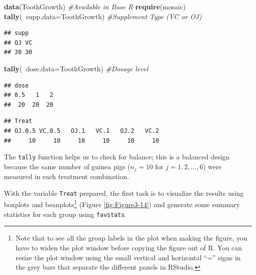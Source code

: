 \documentclass[]{book}
\newenvironment{Shaded}{\begin{snugshade}}{\end{snugshade}}
\newcommand{\KeywordTok}[1]{\textcolor[rgb]{0.13,0.29,0.53}{\textbf{#1}}}
\newcommand{\DataTypeTok}[1]{\textcolor[rgb]{0.13,0.29,0.53}{#1}}
\newcommand{\CommentTok}[1]{\textcolor[rgb]{0.56,0.35,0.01}{\textit{#1}}}
\newcommand{\OperatorTok}[1]{\textcolor[rgb]{0.81,0.36,0.00}{\textbf{#1}}}
\newcommand{\NormalTok}[1]{#1}
\let\rmarkdownfootnote\footnote%
\def\footnote{\protect\rmarkdownfootnote}
\theoremstyle{definition}
\theoremstyle{definition}
\theoremstyle{remark}
\begin{document}
\begin{Shaded}
\begin{Highlighting}[]
\KeywordTok{data}\NormalTok{(ToothGrowth) }\CommentTok{#Available in Base R}
\KeywordTok{require}\NormalTok{(mosaic)}
\KeywordTok{tally}\NormalTok{(}\OperatorTok{~}\NormalTok{supp,}\DataTypeTok{data=}\NormalTok{ToothGrowth) }\CommentTok{#Supplement Type (VC or OJ)}
\end{Highlighting}
\end{Shaded}

\begin{verbatim}
## supp
## OJ VC 
## 30 30
\end{verbatim}

\begin{Shaded}
\begin{Highlighting}[]
\KeywordTok{tally}\NormalTok{(}\OperatorTok{~}\NormalTok{dose,}\DataTypeTok{data=}\NormalTok{ToothGrowth) }\CommentTok{#Dosage level}
\end{Highlighting}
\end{Shaded}

\begin{verbatim}
## dose
## 0.5   1   2 
##  20  20  20
\end{verbatim}

\begin{Shaded}
\end{Shaded}

\begin{verbatim}
## Treat
## OJ.0.5 VC.0.5   OJ.1   VC.1   OJ.2   VC.2 
##     10     10     10     10     10     10
\end{verbatim}

The \texttt{tally} function helps us to check for balance; this is a
balanced design because the same number of guinea pigs
(\(n_j=10 \text{ for } j=1, 2,\ldots, 6\)) were measured in each
treatment combination.

With the variable \texttt{Treat} prepared, the first task is to
visualize the results using boxplots and beanplots\footnote{Note that to
  see all the group labels in the plot when making the figure, you have
  to widen the plot window before copying the figure out of R. You can
  resize the plot window using the small vertical and horizontal ``=''
  signs in the grey bars that separate the different panels in RStudio.}
(Figure \ref{fig:Figure3-14}) and generate some summary statistics for
each group using \texttt{favstats}.
\end{document}
